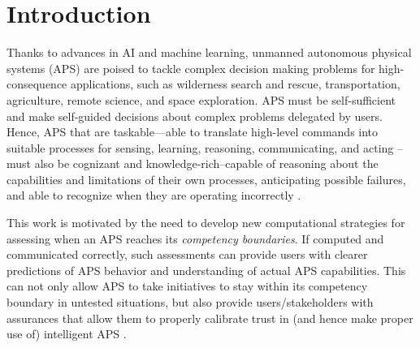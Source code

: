 \section{Introduction}

Thanks to advances in AI and machine learning, unmanned autonomous physical systems (APS) are poised to tackle complex decision making problems for high-consequence applications, such as wilderness search and rescue, transportation, agriculture, remote science, and space exploration. 
APS must be self-sufficient and make self-guided decisions about complex problems delegated by users. Hence, APS that are taskable---able to translate high-level commands into suitable processes for sensing, learning, reasoning, communicating, and acting --must also be cognizant and knowledge-rich--capable of reasoning about the capabilities and limitations of their own processes, anticipating possible failures, and able to recognize when they are operating incorrectly \cite{david2016defense}. %

This work is motivated by the need to develop new computational strategies for assessing when an APS reaches its \emph{competency boundaries}. If computed and communicated correctly, such assessments can provide users with clearer predictions of APS behavior and understanding of actual APS capabilities. This can not only allow APS to take initiatives to stay within its competency boundary in untested situations, but also provide users/stakeholders with assurances that allow them to properly calibrate trust in (and hence make proper use of) intelligent APS \cite{Israelsen2018-es}. 

